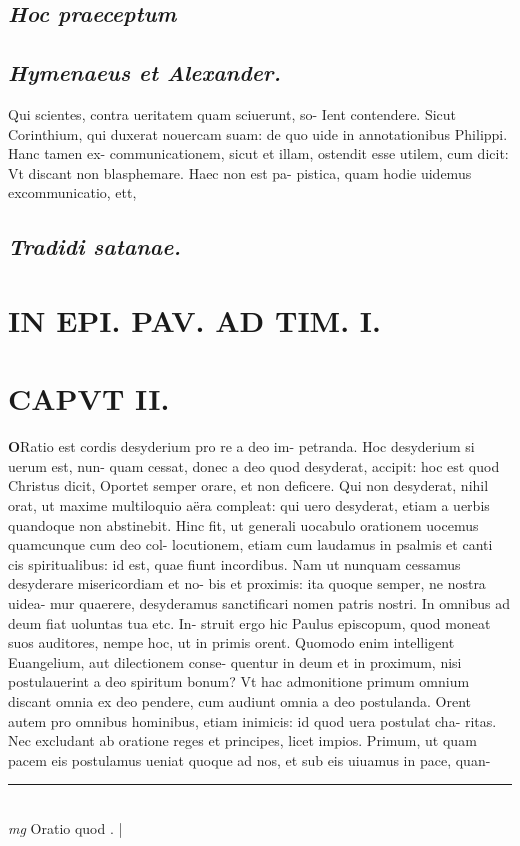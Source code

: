 \documentclass{article}
\begin{document}
\begin{pages}
\subsection*{\textit{Hoc praeceptum }}
{}
\subsection*{\textit{Hymenaeus et Alexander. }}\pstart Qui scientes, contra ueritatem quam sciuerunt, so- Ient contendere.  \pend\pstart Sicut Corinthium, qui duxerat nouercam suam: de quo uide in annotationibus Philippi. Hanc tamen ex- communicationem, sicut et illam, ostendit esse utilem, cum dicit: Vt discant non blasphemare. Haec non est pa- pistica, quam hodie uidemus excommunicatio, ett,  \pend
{}
{}
\subsection*{\textit{Tradidi satanae. }}
\section*{IN EPI. PAV. AD TIM. I. }
\marginpar{[ p.83 ]}
\endnumbering\beginnumbering\section{CAPVT II.}\pstart \huge\textbf{O}\normalsize Ratio est cordis desyderium pro re a deo im- petranda. Hoc desyderium si uerum est, nun- quam cessat, donec a deo quod desyderat, accipit: hoc est quod Christus dicit, Oportet semper orare, et non deficere. Qui non desyderat, nihil orat, ut maxime multiloquio aëra compleat: qui uero desyderat, etiam a uerbis quandoque  non abstinebit. Hinc fit, ut generali uocabulo orationem uocemus quamcunque  cum deo col- locutionem, etiam cum laudamus in psalmis et canti cis spiritualibus: id est, quae fiunt incordibus. Nam ut nunquam cessamus desyderare misericordiam et no- bis et proximis: ita quoque  semper, ne nostra uidea- mur quaerere, desyderamus sanctificari nomen patris nostri. In omnibus ad deum fiat uoluntas tua etc. In- struit ergo hic Paulus episcopum, quod moneat suos auditores, nempe hoc, ut in primis orent. Quomodo enim intelligent Euangelium, aut dilectionem conse- quentur in deum et in proximum, nisi postulauerint a deo spiritum bonum? Vt hac admonitione primum omnium discant omnia ex deo pendere, cum audiunt omnia a deo postulanda. Orent autem pro omnibus hominibus, etiam inimicis: id quod uera postulat cha- ritas. Nec excludant ab oratione reges et principes, licet impios. Primum, ut quam pacem eis postulamus ueniat quoque  ad nos, et sub eis uiuamus in pace, quan-  \pend
\vspace{0.5cm}\noindent
\vspace{0.2cm}\rule{1cm}{0.2pt}\\ 
\hspace{0.2cm}\textit{mg}
\footnotesize Oratio quod . 
\normalsize| 

\end{pages}
\end{document}
